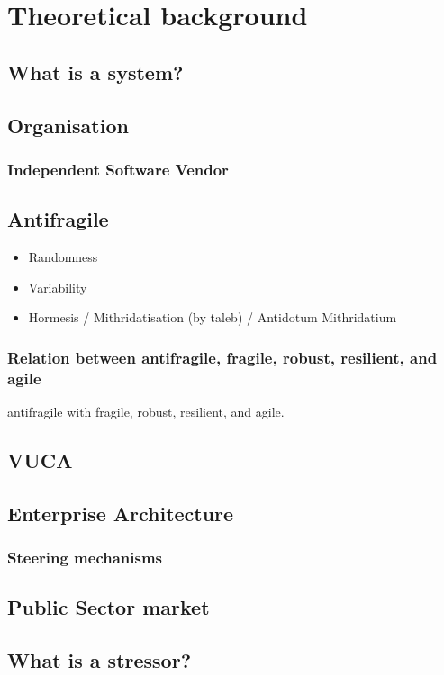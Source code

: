 \chapter{Theoretical background}
\label{ch:theoreticalbackground}

\section{What is a system?}
\label{sec:tbsystem}

\section{Organisation}
\label{sec:tborganisation}

\subsection{Independent Software Vendor}
\label{sub:tbisv}

\section{Antifragile}
\label{sec:tbantifragile}

\begin{itemize}
	\item{Randomness}
	\item{Variability}
	\item{Hormesis / Mithridatisation (by taleb) / Antidotum Mithridatium}
\end{itemize}

\subsection{Relation between antifragile, fragile, robust, resilient, and agile}
\label{sub:tbrelatedtoantifragile}

\gls{antifragile} with \gls{fragile}, \gls{robust}, \gls{resilient}, and \gls{agile}.


\section{VUCA}
\label{sec:tbvuca}

\section{Enterprise Architecture}
\label{sec:tbea}

\subsection{Steering mechanisms}
\label{sub:tbeasteering}


\section{Public Sector market}
\label{sec:tbpsmarket}

\section{What is a stressor?}
\label{sec:stressor}

